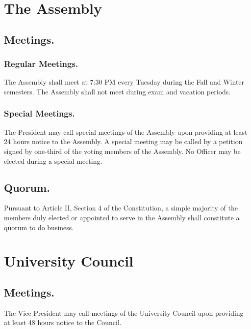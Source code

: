 
\section{The Assembly}

\subsection{Meetings.}

\subsubsection{Regular Meetings.}
The Assembly shall meet at 7:30 PM every Tuesday during the Fall and Winter semesters. The Assembly shall not meet during exam and vacation periods.
\subsubsection{Special Meetings.}
The President may call special meetings of the Assembly upon providing at least 24 hours notice to the Assembly. A special meeting may be called by a petition signed by one-third of the voting members of the Assembly. No Officer may be elected during a special meeting.

\subsection{Quorum.}
Pursuant to Article II, Section 4 of the Constitution, a simple majority of the members duly elected or appointed to serve in the Assembly shall constitute a quorum to do business.

\section{University Council}

\subsection{Meetings.}
The Vice President may call meetings of the University Council upon providing at least 48 hours notice to the Council.